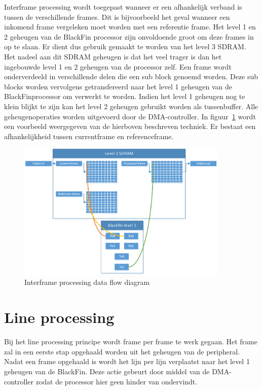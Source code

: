 		\par Interframe processing wordt toegepast wanneer er een afhankelijk verband is tussen de verschillende frames. Dit is bijvoorbeeld het geval wanneer een inkomend frame vergeleken moet worden met een referentie frame. Het level 1 en 2 geheugen van de BlackFin processor zijn onvoldoende groot om deze frames in op te slaan. Er dient dus gebruik gemaakt te worden van het level 3 SDRAM. Het nadeel aan dit SDRAM geheugen is dat het veel trager is dan het ingebouwde level 1 en 2 geheugen van de processor zelf.  Een frame wordt onderverdeeld in verschillende delen die een sub block genoemd worden. Deze sub blocks worden vervolgens getransfereerd naar het level 1 geheugen van de BlackFinprocessor om verwerkt te worden. Indien het level 1 geheugen nog te klein blijkt te zijn kan het level 2 geheugen gebruikt worden als tussenbuffer. Alle geheugenoperaties worden uitgevoerd door de DMA-controller. In figuur~\ref{fig:interframe_processing} wordt een voorbeeld weergegeven van de hierboven beschreven techniek. Er bestaat een afhankelijkheid tussen currentframe en referenceframe.

			\begin{figure}[H]
				\centering
				\includegraphics[width=0.90\textwidth]{Chapters/Chapter4/Images/DMA_interframe_processing.png}
				\caption{Interframe processing data flow diagram}
				\label{fig:interframe_processing}
			\end{figure}

	\section{Line processing}

		\par Bij het line processing principe wordt frame per frame te werk gegaan. Het frame zal in een eerste stap opgehaald worden uit het geheugen van de peripheral. Nadat een frame opgehaald is wordt het lijn per lijn verplaatst naar het level 1 geheugen van de BlackFin. Deze actie gebeurt door middel van de DMA-controller zodat de processor hier geen hinder van ondervindt.

